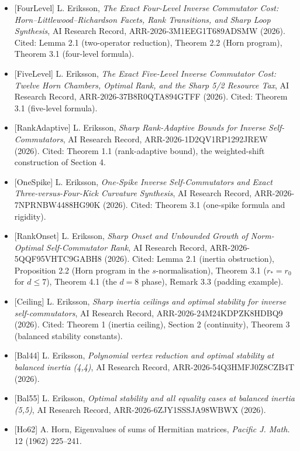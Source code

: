 \documentclass[
  11pt,
  a4paper,
]{article}
\providecommand{\tightlist}{%
  \setlength{\itemsep}{0pt}\setlength{\parskip}{0pt}}
\begin{document}
\begin{itemize}
\tightlist
\item
  {[}FourLevel{]} L. Eriksson, \emph{The Exact Four-Level Inverse
  Commutator Cost: Horn--Littlewood--Richardson Facets, Rank
  Transitions, and Sharp Loop Synthesis}, AI Research Record,
  ARR-2026-3M1EEG1T689ADSMW (2026). Cited: Lemma 2.1 (two-operator
  reduction), Theorem 2.2 (Horn program), Theorem 3.1 (four-level
  formula).
\item
  {[}FiveLevel{]} L. Eriksson, \emph{The Exact Five-Level Inverse
  Commutator Cost: Twelve Horn Chambers, Optimal Rank, and the Sharp 5/2
  Resource Tax}, AI Research Record, ARR-2026-37B8R0QTA894GTFF (2026).
  Cited: Theorem 3.1 (five-level formula).
\item
  {[}RankAdaptive{]} L. Eriksson, \emph{Sharp Rank-Adaptive Bounds for
  Inverse Self-Commutators}, AI Research Record,
  ARR-2026-1D2QV1RP1292JREW (2026). Cited: Theorem 1.1 (rank-adaptive
  bound), the weighted-shift construction of Section 4.
\item
  {[}OneSpike{]} L. Eriksson, \emph{One-Spike Inverse Self-Commutators
  and Exact Three-versus-Four-Kick Curvature Synthesis}, AI Research
  Record, ARR-2026-7NPRNBW4488HG90K (2026). Cited: Theorem 3.1
  (one-spike formula and rigidity).
\item
  {[}RankOnset{]} L. Eriksson, \emph{Sharp Onset and Unbounded Growth of
  Norm-Optimal Self-Commutator Rank}, AI Research Record,
  ARR-2026-5QQF95VHTC9GABH8 (2026). Cited: Lemma 2.1 (inertia
  obstruction), Proposition 2.2 (Horn program in the
  \(s\)-normalisation), Theorem 3.1 (\(r_*=r_0\) for \(d\le7\)), Theorem
  4.1 (the \(d=8\) phase), Remark 3.3 (padding example).
\item
  {[}Ceiling{]} L. Eriksson, \emph{Sharp inertia ceilings and optimal
  stability for inverse self-commutators}, AI Research Record,
  ARR-2026-24M24KDPZK8HDBQ9 (2026). Cited: Theorem 1 (inertia ceiling),
  Section 2 (continuity), Theorem 3 (balanced stability constants).
\item
  {[}Bal44{]} L. Eriksson, \emph{Polynomial vertex reduction and optimal
  stability at balanced inertia (4,4)}, AI Research Record,
  ARR-2026-54Q3HMFJ0Z8CZB4T (2026).
\item
  {[}Bal55{]} L. Eriksson, \emph{Optimal stability and all equality
  cases at balanced inertia (5,5)}, AI Research Record,
  ARR-2026-6ZJY1SSSJA98WBWX (2026).
\item
  {[}Ho62{]} A. Horn, Eigenvalues of sums of Hermitian matrices,
  \emph{Pacific J. Math.} 12 (1962) 225--241.

\end{itemize}
\end{document}
